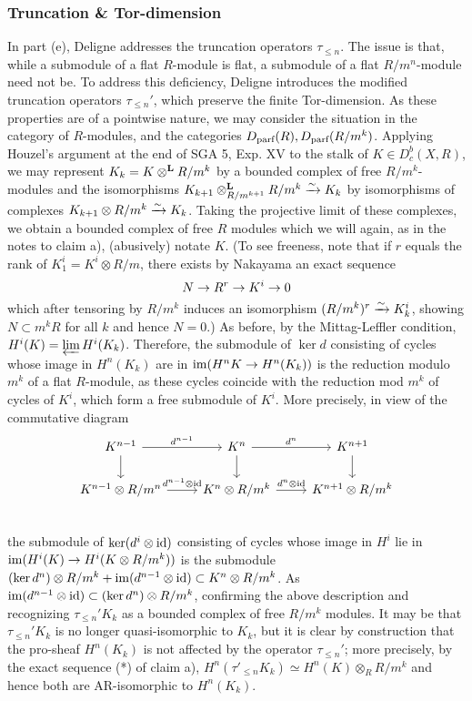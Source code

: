 \documentclass[deligne.tex]{subfiles}
\begin{document}
\subsubsection*{Truncation \& Tor-dimension}
In part (e), Deligne addresses the truncation operators $\tau_{\leq n}$.
The issue is that, while a submodule of a flat $R$-module is flat, a 
submodule of a flat $R/m^n$-module need not be. To address this deficiency, 
Deligne introduces the modified truncation operators $\tau_{\leq n}'$, 
which preserve the finite Tor-dimension. As these properties are of a 
pointwise nature, we may consider the situation in the category of
$R$-modules, and the categories $D_{\text{parf}}(R), D_{\text{parf}}(R/m^k)$.
Applying Houzel's argument at the end of SGA 5, Exp. XV to the stalk of
$K\in D^b_c(X,R)$, we may represent $K_k=K\otimes^{\mathbf{L}} R/m^k$ by a bounded 
complex of free $R/m^k$-modules and the isomorphisms
$K_{k+1}\otimes^{\mathbf{L}}_{R/m^{k+1}} R/m^k\xrightarrow\sim K_k$ by isomorphisms of 
complexes $K_{k+1}\otimes R/m^k\xrightarrow\sim K_k$.
Taking the projective limit of
these complexes, we obtain a bounded complex of free $R$ modules
which we will again, as in the notes to claim a), (abusively) notate $K$.
(To see freeness, note that if $r$ equals the rank of
$K_1^i=K^i\otimes R/m$, there exists by Nakayama an exact sequence
\begin{equation*}
    N\rightarrow R^r\rightarrow K^i\rightarrow 0
\end{equation*}
which after tensoring by $R/m^k$ induces an isomorphism
$(R/m^k)^r\xrightarrow\sim K_k^i$, showing $N\subset m^kR$ for all $k$ and hence $N=0$.)
As before, by the Mittag-Leffler condition, $H^i(K)=\varprojlim H^i(K_k)$.
Therefore, the submodule of $\ker d$ consisting of cycles whose image in
$H^n(K_k)$ are in $\operatorname{im}(H^nK\rightarrow H^n(K_k))$ is the reduction modulo $m^k$ of 
a flat $R$-module, as these cycles coincide with the reduction mod $m^k$ of
cycles of $K^i$, which form a free submodule of $K^i$.
More precisely, in view of the commutative diagram
\begin{equation*}
\begin{tikzcd}
	K^{n-1}\arrow[r,"d^{n-1}"]\arrow[d]&K^n\arrow[r,"d^n"]\arrow[d]&K^{n+1}\arrow[d] \\
	K^{n-1}\otimes R/m^n\arrow[r,"d^{n-1}\otimes\id"]&K^n\otimes R/m^k\arrow[r,"d^n\otimes\id"]&K^{n+1}\otimes R/m^k \\
\end{tikzcd}
\end{equation*}
the submodule of $\ker(d^i\otimes\operatorname{id})$ consisting of cycles whose image in
$H^i$ lie in $\operatorname{im}(H^i(K)\rightarrow H^i(K\otimes R/m^k))$ is the submodule
$(\ker d^n)\otimes R/m^k+\operatorname{im}(d^{n-1}\otimes\operatorname{id})\subset K^n\otimes R/m^k$.
As $\operatorname{im}(d^{n-1}\otimes\operatorname{id})\subset(\ker d^n)\otimes R/m^k$, confirming the
above description and recognizing
$\tau_{\leq n}'K_k$ as a bounded complex of free $R/m^k$ modules.
It may be that $\tau_{\leq n}'K_k$ is no longer quasi-isomorphic to $K_k$, 
but it is clear by construction that the pro-sheaf $H^n(K_k)$ is
not affected by the operator $\tau_{\leq n}'$; more precisely, by the exact
sequence (*) of claim a),
$H^n(\tau'_{\leq n}K_k)\simeq H^n(K)\otimes_RR/m^k$
and hence both are AR-isomorphic to $H^n(K_k)$.
\end{document}
